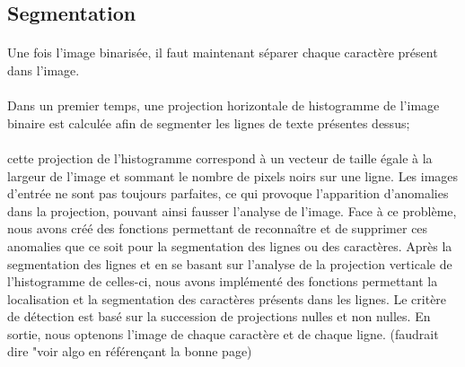 \documentclass[a4paper]{article}
\begin{document}
				




			

			\subsection{Segmentation} 
				\paragraph{} Une fois l'image binarisée, il faut maintenant séparer chaque caractère présent dans l'image.
				
				\paragraph{} Dans un premier temps, une projection horizontale de histogramme de l'image binaire est calculée afin de segmenter les lignes de texte présentes dessus; 
				\paragraph{} cette projection de l'histogramme correspond à un vecteur de taille égale à la largeur de l'image et sommant le nombre de pixels noirs sur une ligne. %
				Les images d'entrée ne sont pas toujours parfaites, ce qui provoque l'apparition d'anomalies dans la projection, pouvant ainsi fausser l'analyse de l'image. Face à ce problème, nous avons créé des fonctions permettant de reconnaître et de supprimer ces anomalies que ce soit pour la segmentation des lignes ou des caractères.
				Après la segmentation des lignes et en se basant sur l'analyse de la projection verticale de l'histogramme de celles-ci, nous avons implémenté des fonctions permettant la localisation et la segmentation des caractères présents dans les lignes. 
				Le critère de détection est basé sur la succession de projections nulles et non nulles. En sortie, nous optenons l'image de chaque caractère et de chaque ligne.
				(faudrait dire "voir algo en référençant la bonne page)
			
		
		
\end{document}
